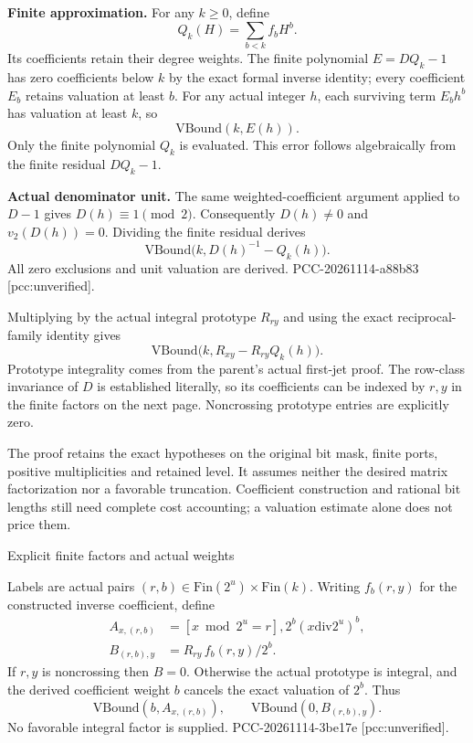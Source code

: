 \documentclass[10pt]{article}
\begin{document}
\textbf{Finite approximation.} For any $k\ge0$, define
\[
 Q_k(H)=\sum_{b<k}f_b H^b.
\]
Its coefficients retain their degree weights. The finite polynomial
$E=DQ_k-1$ has zero coefficients below $k$ by the exact formal inverse
identity; every coefficient $E_b$ retains valuation at least $b$. For any
actual integer $h$, each surviving term $E_bh^b$ has valuation at least $k$,
so
\[
 \mathrm{VBound}(k,E(h)).
\]
Only the finite polynomial $Q_k$ is evaluated. This error follows algebraically
from the finite residual $DQ_k-1$.

\textbf{Actual denominator unit.} The same weighted-coefficient argument
applied to $D-1$ gives $D(h)\equiv1\pmod2$. Consequently $D(h)\ne0$ and
$v_2(D(h))=0$. Dividing the finite residual derives
\[
 \mathrm{VBound}\bigl(k,D(h)^{-1}-Q_k(h)\bigr).
\]
All zero exclusions and unit valuation are derived. PCC-20261114-a88b83
[pcc:unverified].

Multiplying by the actual integral prototype $R_{ry}$ and using the exact
reciprocal-family identity gives
\[
 \mathrm{VBound}\bigl(k,R_{xy}-R_{ry}Q_k(h)\bigr).
\]
Prototype integrality comes from the parent's actual first-jet proof. The
row-class invariance of $D$ is established literally, so its coefficients
can be indexed by $r,y$ in the finite factors on the next page. Noncrossing
prototype entries are explicitly zero.

The proof retains the exact hypotheses on the original bit mask, finite
ports, positive multiplicities and retained level. It assumes neither the
desired matrix factorization nor a favorable truncation. Coefficient
construction and rational bit lengths still need complete cost accounting;
a valuation estimate alone does not price them.

\newpage
\begin{center}{\Large Explicit finite factors and actual weights}\end{center}
Labels are actual pairs $(r,b)\in\mathrm{Fin}(2^u)\times\mathrm{Fin}(k)$.
Writing $f_b(r,y)$ for the constructed inverse coefficient, define
\begin{align*}
 A_{x,(r,b)}&=[x\bmod2^u=r],2^b(x\mathbin{\mathrm{div}}2^u)^b,\\
 B_{(r,b),y}&=R_{ry}\,f_b(r,y)/2^b.
\end{align*}
If $r,y$ is noncrossing then $B=0$. Otherwise the actual prototype is
integral, and the derived coefficient weight $b$ cancels the exact
valuation of $2^b$. Thus
\[
 \mathrm{VBound}(b,A_{x,(r,b)}),\qquad
 \mathrm{VBound}(0,B_{(r,b),y}).
\]
No favorable integral factor is supplied. PCC-20261114-3be17e [pcc:unverified].
\end{document}
